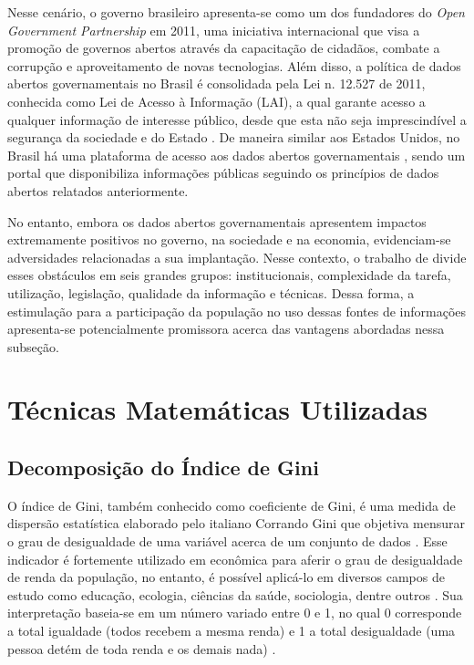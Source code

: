 Nesse cenário, o governo brasileiro apresenta-se como um dos fundadores do \textit{Open Government Partnership} \cite{cap02_ref30} em 2011, uma iniciativa internacional que visa a promoção de governos abertos através da capacitação de cidadãos, combate a corrupção e aproveitamento de novas tecnologias. Além disso, a política de dados abertos governamentais no Brasil é consolidada pela Lei n. 12.527 de 2011, conhecida como Lei de Acesso à Informação (LAI), a qual garante acesso a qualquer informação de interesse público, desde que esta não seja imprescindível a segurança da sociedade e do Estado \cite{cap02_ref31}. De maneira similar aos Estados Unidos, no Brasil há uma plataforma de acesso aos dados abertos governamentais \cite{cap02_ref29}, sendo um portal que disponibiliza informações públicas seguindo os princípios de dados abertos relatados anteriormente.

No entanto, embora os dados abertos governamentais apresentem impactos extremamente positivos no governo, na sociedade e na economia, evidenciam-se adversidades relacionadas a sua implantação. Nesse contexto, o trabalho de \cite{cap02_ref38} divide esses obstáculos em seis grandes grupos: institucionais, complexidade da tarefa, utilização, legislação, qualidade da informação e técnicas. Dessa forma, a estimulação para a participação da população no uso dessas fontes de informações apresenta-se potencialmente promissora acerca das vantagens abordadas nessa subseção.

\section{Técnicas Matemáticas Utilizadas}
\subsection{Decomposição do Índice de Gini}\label{cap:referencias:gini}

O índice de Gini, também conhecido como coeficiente de Gini, é uma medida de dispersão estatística elaborado pelo italiano Corrando Gini que objetiva mensurar o grau de desigualdade de uma variável acerca de um conjunto de dados \cite{cap02_ref19, cap02_ref20}. Esse indicador é fortemente utilizado em econômica para aferir o grau de desigualdade de renda da população, no entanto, é possível aplicá-lo em diversos campos de estudo como educação, ecologia, ciências da saúde, sociologia, dentre outros \cite{cap02_ref23}. Sua interpretação baseia-se em um número variado entre 0 e 1, no qual 0 corresponde a total igualdade (todos recebem a mesma renda) e 1 a total desigualdade (uma pessoa detém de toda renda e os demais nada) \cite{cap02_ref19, cap02_ref21}.

